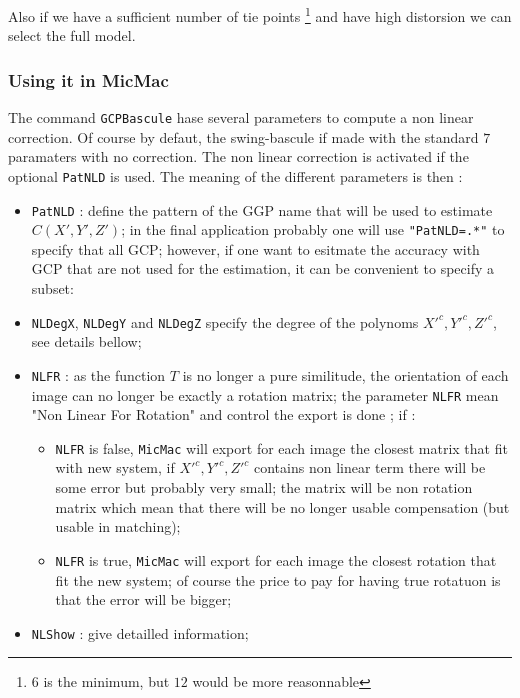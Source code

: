 Also if we have a sufficient number of tie points \footnote{$6$ is the minimum, but $12$ would be more 
reasonnable} and have high distorsion we can select the full model.


\subsubsection{Using it in MicMac}

The command {\tt GCPBascule} hase several parameters to compute a non linear 
correction. Of course by defaut, the swing-bascule if made with the standard $7$ paramaters
with no correction. The non linear correction is activated if the optional {\tt PatNLD} is
used. The meaning of the different parameters is then :


\begin{itemize}
  \item  {\tt PatNLD} :  define the pattern of the GGP name that will be used to estimate  $C(X',Y',Z')$;
         in the final application probably one will use {\tt "PatNLD=.*"} to specify that all GCP; however,
         if one want to esitmate the accuracy with GCP that are not used for the estimation, it can be
         convenient to specify a subset:
   \item  {\tt NLDegX}, {\tt NLDegY} and  {\tt NLDegZ} specify the degree of the polynoms $X'^c,Y'^c,Z'^c$,
          see details bellow;
   \item  {\tt NLFR}  : as the function $T$ is no longer a pure similitude, the orientation of each image
          can no longer be exactly a rotation matrix; the parameter {\tt NLFR} mean "Non Linear For Rotation" and
          control the export is done ; if :

\begin{itemize}
     \item   {\tt NLFR} is false, {\tt MicMac} will export for each image the closest matrix that fit
             with new system, if $X'^c,Y'^c,Z'^c$ contains non linear term there will be some error but
             probably very small; the matrix will be non rotation matrix which mean that there will be
             no longer usable compensation (but usable in matching);

     \item   {\tt NLFR} is true, {\tt MicMac} will export for each image the closest rotation that fit
             the new system; of course the price to pay for having true rotatuon is that the error will be bigger;
            
\end{itemize}

   \item  {\tt NLShow}  : give detailled information;
\end{itemize}



